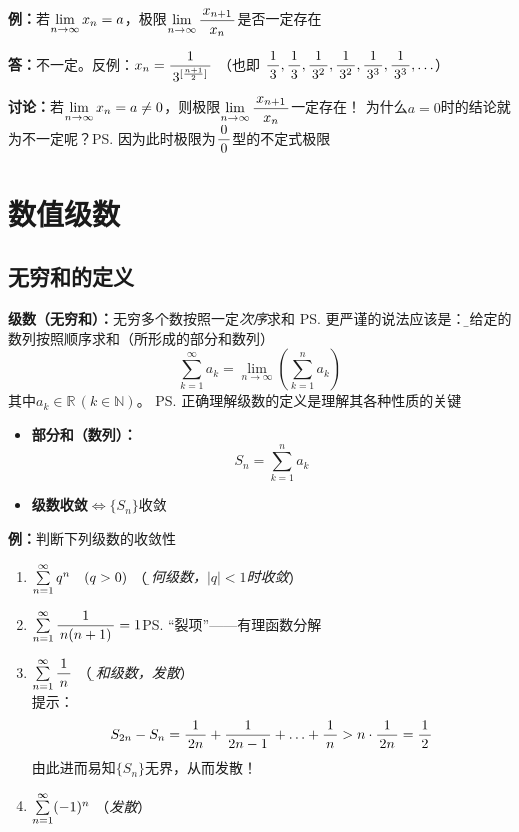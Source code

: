 {\bf 例：}若$\limn x_n=a$，极限$\limn\df{x_{n+1}}{x_n}$是否一定存在

{\bf 答：}不一定。反例：$x_n=\df1{3^{[\frac{n+1}2]}}$ （也即
$\df13, \df13, \df 1{3^2}, \df1{3^2}, \df1{3^3}, \df1{3^3},\ldots$）

{\bf 讨论：}若$\limn x_n=a\ne 0$，则极限$\limn\df{x_{n+1}}{x_n}$一定存在！
为什么$a=0$时的结论就为不一定呢？\ps{因为此时极限为$\df00$型的不定式极限}

\newpage

\section{数值级数}

\subsection{无穷和的定义}

{\bf 级数（无穷和）：}无穷多个数按照一定{\it 次序}求和
\ps{更严谨的说法应该是：\b 对给定的数列按照顺序求和（所形成的部分和数列）}
$$\sum\limits_{k=1}^{\infty}a_k
=\lim_{n\to\infty}\left(\sum_{k=1}^na_k\right)$$  
其中$a_k\in\mathbb{R}\,(k\in\mathbb{N})$。
\ps{正确理解级数的定义是理解其各种性质的关键}

\begin{itemize}
  \item {\bf 部分和（数列）：}
  $$S_n=\sum\limits_{k=1}^na_k$$
  \item {\bf 级数收敛}$\Leftrightarrow\{S_n\}$收敛
\end{itemize}

{\bf 例：}判断下列级数的收敛性
\begin{enumerate}[(1)]
  \setlength{\itemindent}{1cm}
  \item $\sumn q^n\quad (q>0)$ \quad（{\it\b 几何级数，$|q|<1$时收敛}） 
  \item $\sumn\df{1}{n(n+1)}=1$\quad\ps{“裂项”——有理函数分解}
  \item $\sumn\df 1n$ \quad（{\it\b 调和级数，发散}）\\ 
  提示：$$S_{2n}-S_n=\df1{2n}+\df1{2n-1}+\ldots+\df1n
  >n\cdot\df1{2n}=\df12$$
  由此进而易知$\{S_n\}$无界，从而发散！
  \item $\sumn (-1)^n$ \quad（{\it 发散}）
\end{enumerate}

